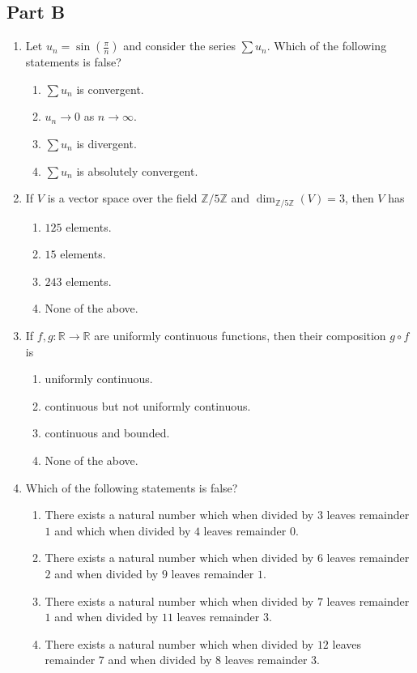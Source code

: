 \documentclass[11pt, a4paper]{article}
\begin{document}
\subsection*{Part B}
\begin{enumerate}
  \item Let $u_n = \sin\left(\frac{\pi}{n}\right)$ and consider the series $\sum u_n$. Which of the following statements is false?
  \begin{enumerate}[label=(\alph*)]
    \item $\sum u_n$ is convergent.
    \item $u_n \to 0$ as $n \to \infty$.
    \item $\sum u_n$ is divergent.
    \item $\sum u_n$ is absolutely convergent.
  \end{enumerate}

  \item If $V$ is a vector space over the field $\mathbb{Z}/5\mathbb{Z}$ and $\dim_{\mathbb{Z}/5\mathbb{Z}}(V) = 3$, then $V$ has
  \begin{enumerate}[label=(\alph*)]
    \item $125$ elements.
    \item $15$ elements.
    \item $243$ elements.
    \item None of the above.
  \end{enumerate}

  \item If $f, g: \mathbb{R} \to \mathbb{R}$ are uniformly continuous functions, then their composition $g \circ f$ is
  \begin{enumerate}[label=(\alph*)]
    \item uniformly continuous.
    \item continuous but not uniformly continuous.
    \item continuous and bounded.
    \item None of the above.
  \end{enumerate}

  \item Which of the following statements is false?
  \begin{enumerate}[label=(\alph*)]
    \item There exists a natural number which when divided by $3$ leaves remainder $1$ and which when divided by $4$ leaves remainder $0$.
    \item There exists a natural number which when divided by $6$ leaves remainder $2$ and when divided by $9$ leaves remainder $1$.
    \item There exists a natural number which when divided by $7$ leaves remainder $1$ and when divided by $11$ leaves remainder $3$.
    \item There exists a natural number which when divided by $12$ leaves remainder $7$ and when divided by $8$ leaves remainder $3$.
  \end{enumerate}


\end{enumerate}
\end{document}
